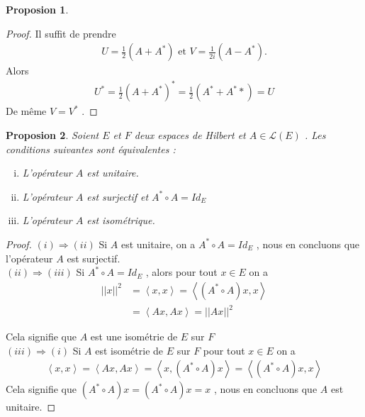 \documentclass{report}
\newtheorem{Prop}{Proposion}[subsection]
\begin{document}
{\begin{Prop}
\end{Prop}
\begin{proof}
Il suffit de prendre 
					\begin{align*}
					 U = \frac{1}{2} (A + A^*) \,\,\text{et}\,\, V = \frac{1}{2i} (A - A^*) .
					\end{align*}
Alors 
					\begin{align*}
					 U^* = \frac{1}{2} (A + A^*)^* = \frac{1}{2} (A^* + A^**) = U 
					\end{align*}
De même $V = V^*$ .
\end{proof}


\begin{Prop} Soient $E$ et $F$ deux espaces de Hilbert et $A \in \mathscr{L}(E)$ . Les conditions suivantes sont équivalentes : 
	\begin{enumerate}[i)]
	\item L'opérateur $A$ est unitaire.
	\item L'opérateur $A$ est surjectif et $A^* \circ A = Id_E$ 
	\item L'opérateur $A$ est isométrique.
	\end{enumerate}
\end{Prop}
\begin{proof}
 $(i)\Rightarrow(ii)$ Si $A$ est unitaire, on a $A^*\circ A = Id_E$ , nous en concluons que l'opérateur $A$ est surjectif.\\
 $(ii)\Rightarrow(iii)$ Si $A^*\circ A = Id_E$ , alors pour tout $x \in E$ on a 
 					\begin{align*}
 					 ||x||^2 &= \left< x,x \right> = \left< (A^*\circ A)x,x \right> \\
					 		  &= \left< Ax,Ax \right> = ||Ax||^2
					\end{align*}



Cela signifie que $A$ est une isométrie de $E$ sur $F$  \\
 $(iii)\Rightarrow(i)$ Si $A$ est isométrie de $E$ sur $F$ pour tout $x \in E$ on a 
 					\begin{align*}
 					 \left< x,x \right> = \left< Ax,Ax \right> = \left< x,(A^*\circ A)x \right> = \left< (A^*\circ A)x,x \right> 
 					\end{align*}
Cela signifie que $(A^*\circ A)x = (A^*\circ A)x = x $ , nous en concluons que $A$ est unitaire.
\end{proof}



}
\end{document}
